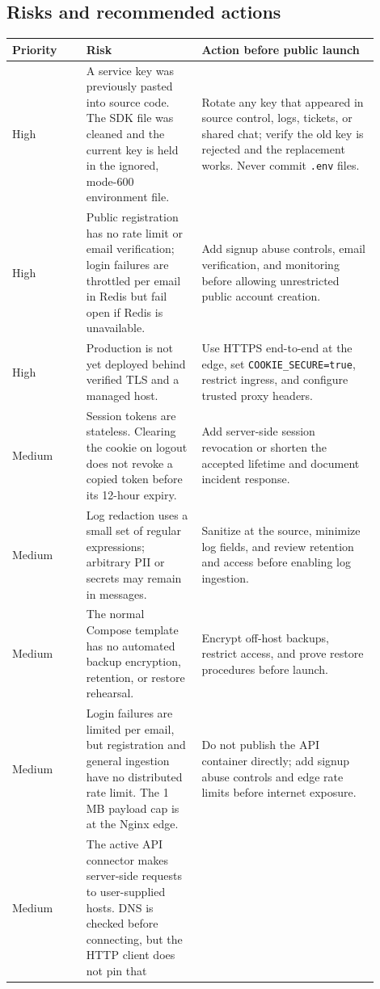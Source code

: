 \documentclass[11pt,a4paper]{article}
\begin{document}
\subsection{Risks and recommended actions}
\begin{longtable}{p{0.18\linewidth}p{0.29\linewidth}p{0.43\linewidth}}
\toprule
\textbf{Priority} & \textbf{Risk} & \textbf{Action before public launch} \\
\midrule
High & A service key was previously pasted into source code. The SDK file was
cleaned and the current key is held in the ignored, mode-600 environment file. &
Rotate any key that appeared in source control, logs, tickets, or shared chat;
verify the old key is rejected and the replacement works. Never commit
\texttt{.env} files. \\
High & Public registration has no rate limit or email verification; login
failures are throttled per email in Redis but fail open if Redis is unavailable. &
Add signup abuse controls, email verification, and monitoring before allowing
unrestricted public account creation. \\
High & Production is not yet deployed behind verified TLS and a managed host. &
Use HTTPS end-to-end at the edge, set \texttt{COOKIE\_SECURE=true}, restrict
ingress, and configure trusted proxy headers. \\
Medium & Session tokens are stateless. Clearing the cookie on logout does not
revoke a copied token before its 12-hour expiry. & Add server-side session
revocation or shorten the accepted lifetime and document incident response. \\
Medium & Log redaction uses a small set of regular expressions; arbitrary PII or
secrets may remain in messages. & Sanitize at the source, minimize log fields,
and review retention and access before enabling log ingestion. \\
Medium & The normal Compose template has no automated backup encryption,
retention, or restore rehearsal. & Encrypt off-host backups, restrict access, and
prove restore procedures before launch. \\
Medium & Login failures are limited per email, but registration and general
ingestion have no distributed rate limit. The 1 MB payload cap is at the Nginx
edge. & Do not publish the API container directly; add signup abuse controls and
edge rate limits before internet exposure. \\
Medium & The active API connector makes server-side requests to user-supplied
hosts. DNS is checked before connecting, but the HTTP client does not pin that

\end{longtable}
\end{document}
